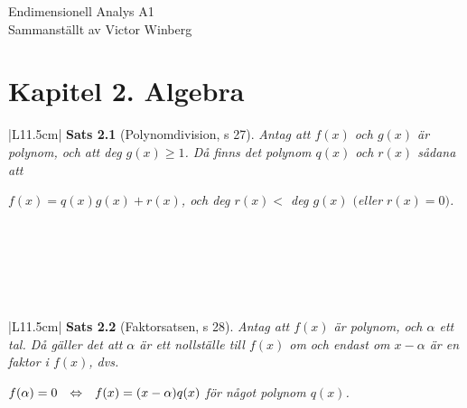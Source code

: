 \documentclass[a4paper]{article}
\begin{document}
\begin{center}
\LARGE Endimensionell Analys A1\\
\large Sammanställt av Victor Winberg\\
\end{center}
\renewcommand{\arraystretch}{1.5}
\section*{Kapitel 2. Algebra}
\begin{tabular}{|L{11.5cm}|} \hline
\textbf{Sats 2.1} (Polynomdivision, s 27). 
\textit{Antag att $f(x)$ och $g(x)$ är polynom, och att deg $g(x) \geq 1$. Då finns det polynom $q(x)$ och $r(x)$ sådana att}
\begin{center}
\textit{$f(x) = q(x)g(x)+r(x)$, \hspace{0.5cm} och deg $r(x) <$ deg $g(x)$ $($eller $r(x) = 0)$.} \\
\end{center}
\\\hline
\end{tabular}
\\\\\\
\begin{tabular}{|L{11.5cm}|} \hline
\textbf{Sats 2.2} (Faktorsatsen, s 28). 
\textit{Antag att $f(x)$ är polynom, och $\alpha$ ett tal. Då gäller det att $\alpha$ är ett nollställe till $f(x)$ om och endast om $x - \alpha$ är en faktor i $f(x)$, dvs.}
\begin{center}
\textit{$f(\alpha) = 0 \hspace{0.25cm}\Leftrightarrow\hspace{0.25cm} f(x) = (x-\alpha)q(x)$ \hspace{0.5cm} för något polynom $q(x)$.} \\
\end{center}
\\\hline
\end{tabular}
\end{document}
